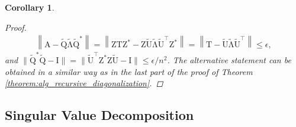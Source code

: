 \documentclass{article}
\newcommand{\lnorm}{\left\|}
\newcommand{\rnorm}{\right\|}
\newtheorem{corollary}{Corollary}[section]
\newcommand\matA{\boldsymbol{\mathrm{A}}}
\newcommand\matI{\boldsymbol{\mathrm{I}}}
\newcommand\matT{\boldsymbol{\mathrm{T}}}
\newcommand\matZ{\boldsymbol{\mathrm{Z}}}
\newcommand\matQtilde{\widetilde{\boldsymbol{\mathrm{Q}}}}
\newcommand\matUtilde{\widetilde{\boldsymbol{\mathrm{U}}}}
\newcommand\matLambdatilde{\widetilde{\boldsymbol{\mathrm{\Lambda}}}}
\begin{document}
\begin{corollary}
\begin{proof}
        \begin{align*}
            \lnorm \matA-\matQtilde\matLambdatilde\matQtilde^* \rnorm=
            \lnorm \matZ\matT\matZ^*-\matZ\matUtilde\matLambdatilde\matUtilde^\top\matZ^* \rnorm=
            \lnorm \matT-\matUtilde\matLambdatilde\matUtilde^\top \rnorm
            \leq \epsilon,
        \end{align*}
        and $\|\matQtilde^*\matQtilde-\matI\|=\|\matUtilde^\top\matZ^*\matZ\matUtilde-\matI\|\leq \epsilon/n^2$.
        The alternative statement can be obtained in a similar way as in the last part of the proof of Theorem \ref{theorem:alg_recursive_diagonalization}.
    \end{proof}
\end{corollary}

\subsection{Singular Value Decomposition}
\label{appendix:svd_analysis}
\end{document}
